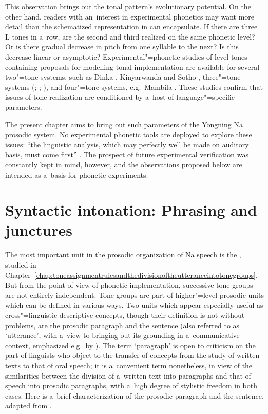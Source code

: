 This observation brings out the tonal  pattern's evolutionary potential. On the other hand, readers with an~interest in experimental phonetics may want more detail than the schematized representation in  can encapsulate. If there are three L tones in a~row, are the second and third realized on the same phonetic level? Or is there gradual decrease in pitch from one syllable to the next? Is this decrease linear or asymptotic? Experimental"=phonetic studies of level tones containing proposals for modelling tonal implementation are available for several two"=tone systems, such as Dinka
\citep{remijsenetal2008}, Kinyarwanda \citep{myers2003} and Sotho
\citep{zerbianetal2010a,zerbianetal2010b}, three"=tone systems
(\citealt[48--65]{teo2014}; \citealt[100--106]{coupe2003};
\citealt{laniranetal2003}), and four"=tone systems, e.g.~Mambila
\citep{connell2003, connell2016}. These studies confirm that issues of tone realization are conditioned by a~host of language"=specific parameters. 

The present chapter aims to bring out such parameters of the Yongning Na prosodic system. No experimental phonetic tools are deployed to explore these issues: ``the linguistic analysis, which may perfectly well be made on auditory basis, must come first'' \citep[4]{fischer1949}. The prospect of future experimental verification was constantly kept in mind, however, and the observations proposed below are intended as a~basis for phonetic experiments.

\section{Syntactic intonation: Phrasing and junctures}
\label{sec:syntacticintonationphrasingandjunctures}

The most important unit in the prosodic organization of Na speech is the , studied in Chapter~\ref{chap:toneassignmentrulesandthedivisionoftheutteranceintotonegroups}. But from the
point of view of phonetic implementation, successive tone groups are not entirely independent. Tone
groups are part of higher"=level prosodic units which can be defined in various ways. Two units
which appear especially useful as cross"=linguistic descriptive concepts, though their definition is
not without problems, are the prosodic paragraph and the sentence (also referred to as
‘utterance’, with a~view to bringing out its grounding in a~communicative context, emphasized e.g.~by \citealt{culioli1995}). The term ‘paragraph’ is open to criticism on the part of linguists who object
to the transfer of concepts from the study of written texts to that of oral speech; it is
a~convenient term nonetheless, in view of the similarities between the division of a~written text
into paragraphs and that of speech into prosodic paragraphs, with a~high degree of stylistic freedom in both cases. Here is a~brief characterization of the prosodic paragraph and the sentence, adapted from \citet[50–52]{vaissiereetal2006}.

